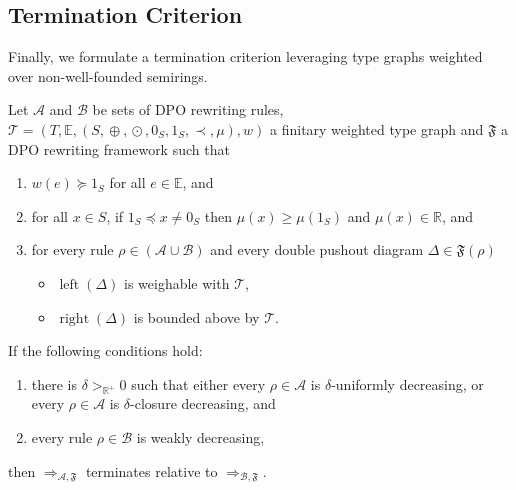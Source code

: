 \subsection{Termination Criterion}
\label{nwf:sec:proving_termination}
Finally, we formulate a termination criterion leveraging type graphs weighted over non-well-founded semirings. 
\begin{theorem} 
    \label{nwf:thm:termination_grs}
    Let $\mathcal{A}$ and $\mathcal{B}$ be sets of DPO rewriting rules, $\mathcal{T} \mathop{=} (T,\mathbb{E}, (S, \mathop{\oplus}, \mathop{\odot}, 0_S, 1_S, \prec, \mu), w)$ a finitary weighted type graph and $\mathfrak{F}$ a DPO rewriting framework such that

     \begin{enumerate}[label=\roman*)]
        \item\label{thm1:hyp3} $w(e) \mathop{\succeq} 1_S$ for all $e \mathop{\in} \mathbb{E}$, and
        \item\label{thm1:hyp4} for all $x \mathop{\in} S$, if $ 1_S \mathop{\preceq} x \mathop{\neq} 0_S$ then $\mu(x) \mathop{\geq} \mu(1_S)$ and $\mu(x) \mathop{\in} \mathbb{R}$, and
        \item for every rule $\rho \mathop{\in} (\mathcal{A }\mathop{\cup} \mathcal{B })$ and every double pushout diagram  
        $\Delta \mathop{\in} \mathfrak{F}(\rho)$ 
        \begin{itemize}
            \item \(\operatorname{left}(\Delta)\) is weighable with \(\mathcal{T}\),
            \item \(\operatorname{right}(\Delta)\) is bounded above by \(\mathcal{T}\). 
        \end{itemize}
    \end{enumerate}       

    \noindent If the following conditions hold:
    \begin{enumerate}
        \item there is $\delta >_{\mathbb{R}^+} 0$ such that either every $\rho \mathop{\in} \mathcal{A}$ is $\delta$-uniformly decreasing, or every $\rho \mathop{\in} \mathcal{A}$ is $\delta$-closure decreasing, and
        \item every rule $\rho \mathop{\in} \mathcal{B}$ is weakly decreasing,
    \end{enumerate}
    then $\mathop{\Rightarrow}_{\mathcal{A},\mathfrak{F}}$ terminates relative to $\mathop{\Rightarrow}_{\mathcal{B},\mathfrak{F}}$.
\end{theorem} 
 
